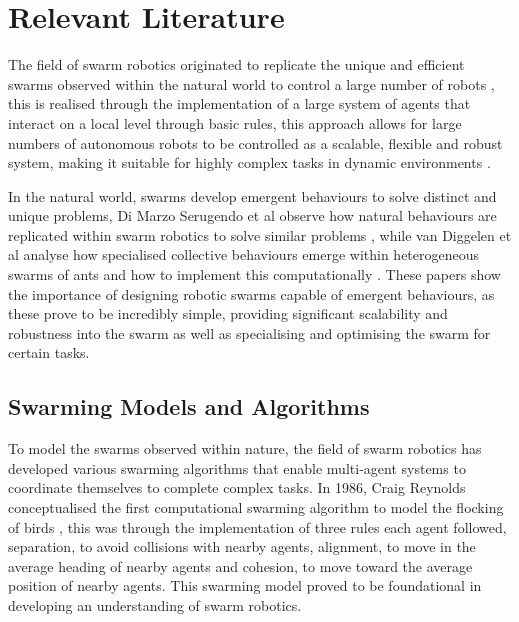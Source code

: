 \documentclass[conference]{IEEEtran}
\begin{document}
\section{Relevant Literature}

The field of swarm robotics originated to replicate the unique and efficient swarms observed within the natural world to control a large number of robots \cite{sahin_swarm_2005}, this is realised through the implementation of a large system of agents that interact on a local level through basic rules, this approach allows for large numbers of autonomous robots to be controlled as a scalable, flexible and robust system, making it suitable for highly complex tasks in dynamic environments \cite{brambilla_swarm_2013}. 

In the natural world, swarms develop emergent behaviours to solve distinct and unique problems, Di Marzo Serugendo et al observe how natural behaviours are replicated within swarm robotics to solve similar problems \cite{di_marzo_serugendo_self-organisation_2004}, while van Diggelen et al analyse how specialised collective behaviours emerge within heterogeneous swarms of ants and how to implement this computationally \cite{van_diggelen_emergence_2024}. These papers show the importance of designing robotic swarms capable of emergent behaviours, as these prove to be incredibly simple, providing significant scalability and robustness into the swarm as well as specialising and optimising the swarm for certain tasks. 

\subsection{Swarming Models and Algorithms}

To model the swarms observed within nature, the field of swarm robotics has developed various swarming algorithms that enable multi-agent systems to coordinate themselves to complete complex tasks. In 1986, Craig Reynolds conceptualised the first computational swarming algorithm to model the flocking of birds \cite{reynolds_flocks_1987}, this was through the implementation of three rules each agent followed, separation, to avoid collisions with nearby agents, alignment, to move in the average heading of nearby agents and cohesion, to move toward the average position of nearby agents. This swarming model proved to be foundational in developing an understanding of swarm robotics. 
\end{document}

